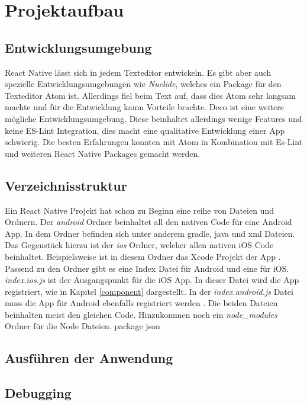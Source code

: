\section{Projektaufbau}

\subsection{Entwicklungsumgebung}
React Native lässt sich in jedem Texteditor entwickeln. Es gibt aber auch spezielle Entwicklungsumgebungen wie \textit{Nuclide}, welches ein Package für den Texteditor Atom ist. Allerdings fiel beim Text auf, dass dies Atom sehr langsam machte und für die Entwicklung kaum Vorteile brachte. Deco ist eine weitere mögliche Entwicklungsumgebung. Diese beinhaltet allerdings wenige Features und keine ES-Lint Integration, dies macht eine qualitative Entwicklung einer App schwierig. Die besten Erfahrungen konnten mit Atom in Kombination mit Es-Lint und weiteren React Native Packages gemacht werden. 

\subsection{Verzeichnisstruktur}
Ein React Native Projekt hat schon zu Beginn eine reihe von Dateien und Ordnern. Der \textit{android} Ordner beinhaltet all den nativen Code für eine Android App. In dem Ordner befinden sich unter anderem gradle, java und xml Dateien. Das Gegenstück hierzu ist der \textit{ios} Ordner, welcher allen nativen iOS Code beinhaltet. Beispielsweise ist in diesem Ordner das Xcode Projekt der App \cite{carli_project_2016}. Passend zu den Ordner gibt es eine Index Datei für Android und eine für iOS. \textit{index.ios.js} ist der Ausgangspunkt für die iOS App. In dieser Datei wird die App registriert, wie in Kapitel \ref{component} dargestellt. In der \textit{index.android.js} Datei muss die App für Android ebenfalls registriert werden \cite{carli_project_2016}. Die beiden Dateien beinhalten meist den gleichen Code. Hinzukommen noch ein \textit{node_modules} Ordner für die Node Dateien. 
package json



\subsection{Ausführen der Anwendung}

\subsection{Debugging}